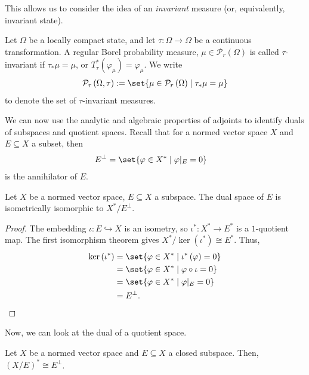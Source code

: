 \documentclass[10pt]{mypackage}
\begin{document}
This allows us to consider the idea of an \textit{invariant} measure (or, equivalently, invariant state).
\begin{definition}
  Let $\Omega$ be a locally compact state, and let $\tau: \Omega\rightarrow\Omega$ be a continuous transformation. A regular Borel probability measure, $\mu\in \mathcal{P}_r\left(\Omega\right)$ is called $\tau$-invariant if $\tau_{\ast}\mu = \mu$, or $T_{\tau}^{\ast}\left(\varphi_{\mu}\right) = \varphi_{\mu}$. We write
  \begin{align*}
    \mathcal{P}_{r}\left(\Omega,\tau\right) := \set{\mu\in \mathcal{P}_{r}\left(\Omega\right)\mid \tau_{\ast}\mu = \mu}
  \end{align*}
  to denote the set of $\tau$-invariant measures.
\end{definition}
We can now use the analytic and algebraic properties of adjoints to identify duals of subspaces and quotient spaces. Recall that for a normed vector space $X$ and $E\subseteq X$ a subset, then
\begin{align*}
  E^{\perp} &= \set{\varphi\in X^{\ast}\mid \varphi|_{E} = 0}
\end{align*}
is the annihilator of $E$.
\begin{proposition}
  Let $X$ be a normed vector space, $E\subseteq X$ a subspace. The dual space of $E$ is isometrically isomorphic to $X^{\ast}/E^{\perp}$.
\end{proposition}
\begin{proof}
  The embedding $\iota: E\hookrightarrow X$ is an isometry, so $\iota^{\ast}: X^{\ast}\rightarrow E^{\ast}$ is a $1$-quotient map. The first isomorphism theorem gives $X^{\ast}/\ker\left(\iota^{\ast}\right) \cong E^{\ast}$. Thus,
  \begin{align*}
    \ker\left(\iota^{\ast}\right) &= \set{\varphi\in X^{\ast}\mid \iota^{\ast}\left(\varphi\right) = 0}\\
                                  &= \set{\varphi\in X^{\ast}\mid \varphi\circ\iota = 0}\\
                                  &= \set{\varphi\in X^{\ast}\mid \varphi|_{E} = 0}\\
                                  &= E^{\perp}.
  \end{align*}
\end{proof}
Now, we can look at the dual of a quotient space.
\begin{proposition}
  Let $X$ be a normed vector space and $E\subseteq X$ a closed subspace. Then, $\left(X/E\right)^{\ast} \cong E^{\perp}$.
\end{proposition}
\end{document}
